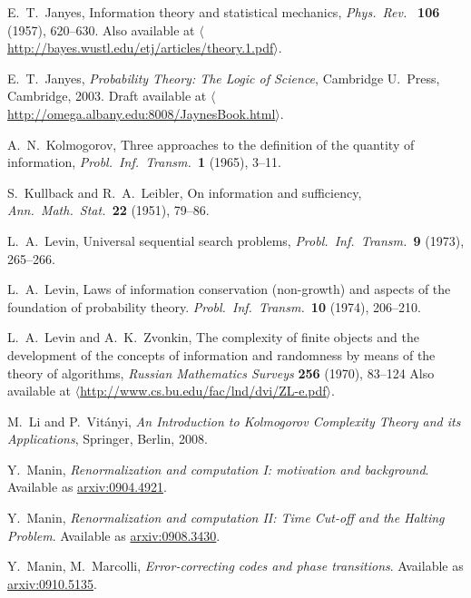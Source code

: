\documentclass{article}
\begin{document}
\begin{thebibliography}{10}
 E.\ T.\ Janyes, 
Information theory and statistical mechanics, \textit{Phys.\ Rev.\ } 
\textbf{106} (1957), 620--630.  Also available at  \hfill \break
\href{http://bayes.wustl.edu/etj/articles/theory.1.pdf}
{$\langle$http://bayes.wustl.edu/etj/articles/theory.1.pdf$\rangle$}.

 E.\ T.\ Janyes, 
{\sl Probability Theory: The Logic of Science}, 
Cambridge U.\ Press, Cambridge, 2003.
Draft available at \hfill \break
 \href{http://omega.albany.edu:8008/JaynesBook.html}
{$\langle$http://omega.albany.edu:8008/JaynesBook.html$\rangle$}.

 A.\ N.\ Kolmogorov, Three approaches to 
the definition of the quantity of information, 
{\sl Probl.\ Inf.\ Transm.\ }\textbf{1} (1965), 3--11.

 S.\ Kullback and R.\ A.\ Leibler, On information and 
sufficiency, \textsl{Ann.\ Math.\ Stat.\ }\textbf{22}
(1951), 79--86.

 L.\ A.\ Levin, Universal sequential search
problems, \textit{Probl.\ Inf.\ Transm.\ }\textbf{9}
(1973), 265--266.

 L.\ A.\ Levin, Laws of information conservation
(non-growth) and aspects of the foundation of probability theory.
\textit{Probl.\ Inf.\ Transm.\ }\textbf{10} (1974),
206--210.

 L.\ A.\ Levin and A.\ K.\ Zvonkin, The 
complexity of finite objects and the development of the concepts of
information and randomness by means of the theory of algorithms, 
\textsl{Russian Mathematics Surveys} {\bf 256} (1970), 83--124
Also available at \href{http://www.cs.bu.edu/fac/lnd/dvi/ZL-e.pdf}
{$\langle$http://www.cs.bu.edu/fac/lnd/dvi/ZL-e.pdf$\rangle$}.

 M.\ Li and P.\ Vit\'anyi, \textsl{An Introduction
to Kolmogorov Complexity Theory and its Applications}, Springer,
Berlin, 2008.

 Y.\ Manin, \textsl{Renormalization and 
computation I: motivation and background}.  Available as
\href{http://arxiv.org/abs/0904.4921}{arxiv:0904.4921}.

 Y.\ Manin, \textsl{Renormalization and 
computation II: Time Cut-off and the Halting Problem}. Available as
\href{http://arxiv.org/abs/0908.3430}{arxiv:0908.3430}.

 Y.\ Manin, M.\ Marcolli, \textsl{Error-correcting 
codes and phase transitions}. Available as
\href{http://arxiv.org/abs/0910.5135}{arxiv:0910.5135}.


\end{thebibliography}
\end{document}
